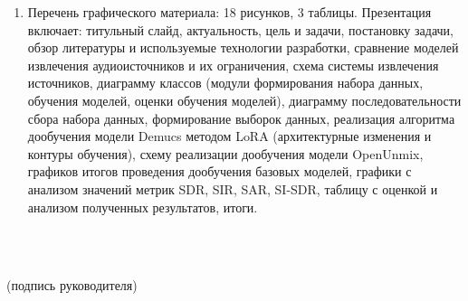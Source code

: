 \documentclass[14pt]{extarticle}
\begin{document}
\begin{enumerate}[label=\arabic*., leftmargin=0pt, labelsep=0.25em, itemindent=13pt, itemsep=6pt]
	\hspace{13pt}Приложение Б.\par
	\newpage
	\item Перечень графического материала: 18 рисунков, 3 таблицы. Презентация включает: 
	титульный слайд, актуальность, цель и задачи, постановку задачи, обзор литературы и 
	используемые технологии разработки, сравнение моделей извлечения аудиоисточников и их 
	ограничения, схема системы извлечения источников, диаграмму классов (модули формирования набора
	данных, обучения моделей, оценки обучения моделей), диаграмму последовательности сбора набора данных,
	формирование выборок данных, реализация алгоритма дообучения модели Demucs методом LoRA (архитектурные
	изменения и контуры обучения), схему реализации дообучения модели OpenUnmix, графиков итогов
	проведения дообучения базовых моделей, графики с анализом значений метрик SDR, SIR, SAR, SI-SDR,
	таблицу с оценкой и анализом полученных результатов, итоги.
\end{enumerate}
\advance\hoffset-1.5cm %

\vspace{1em}
\\
\vspace{1em}
\noindent
\hspace*{9cm} 
\begin{minipage}{6cm} 
	\centering
	\underline{\hspace{\linewidth}} \\[-0.3em]
	{\footnotesize (подпись руководителя)}
\end{minipage}
\end{document}
